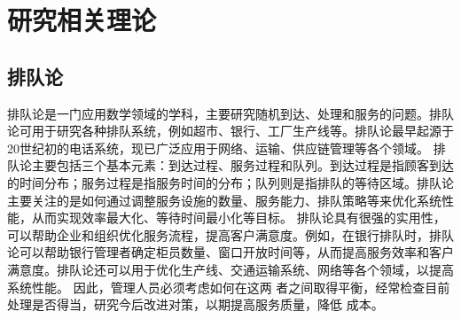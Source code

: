 \section{研究相关理论}
\subsection{排队论}
排队论是一门应用数学领域的学科，主要研究随机到达、处理和服务的问题。排队论可用于研究各种排队系统，例如超市、银行、工厂生产线等。排队论最早起源于20世纪初的电话系统，现已广泛应用于网络、运输、供应链管理等各个领域。
排队论主要包括三个基本元素：到达过程、服务过程和队列。到达过程是指顾客到达的时间分布；服务过程是指服务时间的分布；队列则是指排队的等待区域。排队论主要关注的是如何通过调整服务设施的数量、服务能力、排队策略等来优化系统性能，从而实现效率最大化、等待时间最小化等目标。
排队论具有很强的实用性，可以帮助企业和组织优化服务流程，提高客户满意度。例如，在银行排队时，排队论可以帮助银行管理者确定柜员数量、窗口开放时间等，从而提高服务效率和客户满意度。排队论还可以用于优化生产线、交通运输系统、网络等各个领域，以提高系统性能。
因此，管理人员必须考虑如何在这两
者之间取得平衡，经常检查目前处理是否得当，研究今后改进对策，以期提高服务质量，降低
成本\cite{ycx, jtgc}。






